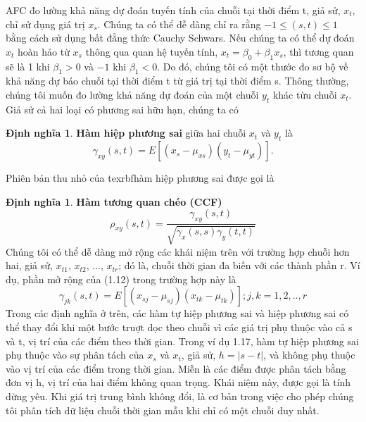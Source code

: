 \documentclass[12pt, a4paper,oneside]{book}
\theoremstyle{definition}
\newtheorem{dn}[theo]{Định nghĩa}
\begin{document}
AFC đo lường khả năng dự đoán tuyến tính của chuỗi tại thời điểm t, giả sử, $x_t$, chỉ sử dụng giá trị $x_s$. Chúng ta có thể dễ dàng chỉ ra rằng $-1 \le (s,t)\le 1$ bằng cách sử dụng bất đẳng thức Cauchy Schwars. Nếu chúng ta có thể dự đoán $x_t$ hoàn hảo từ $x_s$ thông qua quan hệ tuyến tính, $x_t=\beta_0+\beta_1 x_s$, thì tương quan sẽ là 1 khi $\beta_1>0$ và $-1$ khi $\beta_1<0$. Do đó, chúng tôi có một thước đo sơ bộ về khả năng dự báo chuỗi tại thời điểm t từ giá trị tại thời điểm s. Thông thường, chúng tôi muốn đo lường khả năng dự đoán của một chuỗi $y_t$ khác từu chuỗi $x_t$. Giả sử cả hai loại có phương sai hữu hạn, chúng ta có
\begin{dn}\textbf{Hàm hiệp phương sai} giữa hai chuỗi $x_{t}$ và $y_{t}$ là $$\gamma_{xy}(s,t) = E[(x_{s}- \mu_{xs})(y_{t}- \mu_{yt})].$$
\end{dn}
Phiên bản thu nhỏ của texrbf{hàm hiệp phương sai} được gọi là
\begin{dn}\textbf{Hàm tương quan chéo (CCF)}
	$$\rho_{xy}(s,t) = \dfrac{\gamma_{xy}(s,t)}{\sqrt{\gamma_{x}(s,s)\gamma_{y}(t,t)}}$$
	Chúng tôi có thể dễ dàng mở rộng các khái niệm trên với trường hợp chuỗi hơn hai, giả sử, $x_{t1}$, $x_{t2}$, ..., $x_{tr}$; đó là, chuỗi thời gian đa biến với các thành phần r. Ví dụ, phần mở rộng của (1.12) trong trường hợp này là
	$$\gamma_{jk}(s,t) = E [(x_{sj}-\mu_{sj})(x_{tk}-\mu_{tk})];   j,k= 1,2,..,r$$
	Trong các định nghĩa ở trên, các hàm tự hiệp phương sai và hiệp phương sai có thể thay đổi khi một bước truợt dọc theo chuỗi vì các giá trị phụ thuộc vào cả s và t, vị trí của các điểm theo thời gian. Trong ví dụ 1.17, hàm tự hiệp phương sai phụ thuộc vào sự phân tách của $x_{s}$ và $x_{t}$, giả sử, $h= \lvert s-t\lvert$, và không phụ thuộc vào vị trí của các điểm trong thời gian. Miễn là các điểm được phân tách bằng đơn vị h, vị trí của hai điểm không quan trọng. Khái niệm này, được gọi là tính dừng yêu. Khi giá trị trung bình không đổi, là cơ bản trong việc cho phép chúng tôi phân tích dữ liệu chuỗi thời gian mẫu khi chỉ có một chuỗi duy nhất.
\end{dn}
\end{document}
